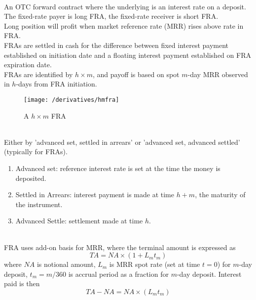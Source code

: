 \begin{remark} \\
An OTC forward contract where the underlying is an interest rate on a deposit.\\
The fixed-rate payer is long FRA, the fixed-rate receiver is short FRA.\\
Long position will profit when market reference rate (MRR) rises above rate in FRA.\\
FRAs are settled in cash for the difference between fixed interest payment established on initiation date and a floating interest payment established on FRA expiration date.\\
FRAs are identified by $h \times m$, and payoff is based on spot $m$-day MRR observed in $h$-days from FRA initiation.
\end{remark}

\begin{figure}[H]
\centering
\texttt{[image: /derivatives/hmfra]}
\caption{A $h \times m$ FRA}
\end{figure}

\begin{remark} \\
Either by 'advanced set, settled in arrears' or 'advanced set, advanced settled' (typically for FRAs).
\begin{enumerate}[label=\roman*.]
\setlength{\itemsep}{0pt}
\item Advanced set: reference interest rate is set at the time the money is deposited.
\item Settled in Arrears: interest payment is made at time $h+m$, the maturity of the instrument.
\item Advanced Settle: settlement made at time $h$.
\end{enumerate}
\end{remark}

\begin{remark} \\
FRA uses add-on basis for MRR, where the terminal amount is expressed as
\begin{equation}
TA = NA \times (1 + L_m t_m) \nonumber
\end{equation}
where $NA$ is notional amount, $L_m$ is MRR spot rate (set at time $t=0$) for $m$-day deposit, $t_m = m/360$ is accrual period as a fraction for $m$-day deposit.
Interest paid is then
\begin{equation}
TA - NA = NA \times (L_m t_m) \nonumber
\end{equation}
\end{remark}

